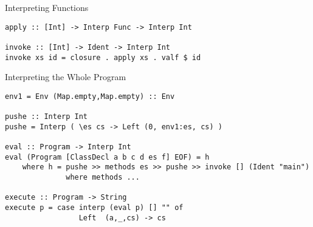 \documentclass[12pt]{beamer}
\newcommand{\codesize}{\fontsize{7.7}{7.7}}
\begin{document}
\begin{spacing}{1.3}
\begin{frame}[fragile=singleslide]{Interpreting Functions}
\begin{verbatim}
apply :: [Int] -> Interp Func -> Interp Int

invoke :: [Int] -> Ident -> Interp Int
invoke xs id = closure . apply xs . valf $ id
\end{verbatim}
\end{frame}

\begin{frame}[fragile=singleslide]{Interpreting the Whole Program}
\begin{verbatim}
env1 = Env (Map.empty,Map.empty) :: Env

pushe :: Interp Int
pushe = Interp ( \es cs -> Left (0, env1:es, cs) )

eval :: Program -> Interp Int
eval (Program [ClassDecl a b c d es f] EOF) = h
    where h = pushe >> methods es >> pushe >> invoke [] (Ident "main")
              where methods ...

execute :: Program -> String
execute p = case interp (eval p) [] "" of
                 Left  (a,_,cs) -> cs
\end{verbatim}
\end{frame}

\end{spacing}
\end{document}

